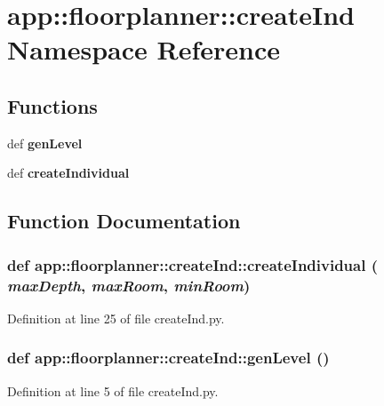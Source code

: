\section{app::floorplanner::createInd Namespace Reference}
\label{namespaceapp_1_1floorplanner_1_1createInd}


\subsection*{Functions}
\begin{CompactItemize}
\item 
def {\bf genLevel}
\item 
def {\bf createIndividual}
\end{CompactItemize}


\subsection{Function Documentation}
\subsubsection{\setlength{\rightskip}{0pt plus 5cm}def app::floorplanner::createInd::createIndividual ( {\em maxDepth},  {\em maxRoom},  {\em minRoom})}\label{namespaceapp_1_1floorplanner_1_1createInd_05639993b65a29497f666997ba226875}




Definition at line 25 of file createInd.py.
\subsubsection{\setlength{\rightskip}{0pt plus 5cm}def app::floorplanner::createInd::genLevel ()}\label{namespaceapp_1_1floorplanner_1_1createInd_5f1c4dbcc13aa507fabffa34c61f1d6c}




Definition at line 5 of file createInd.py.